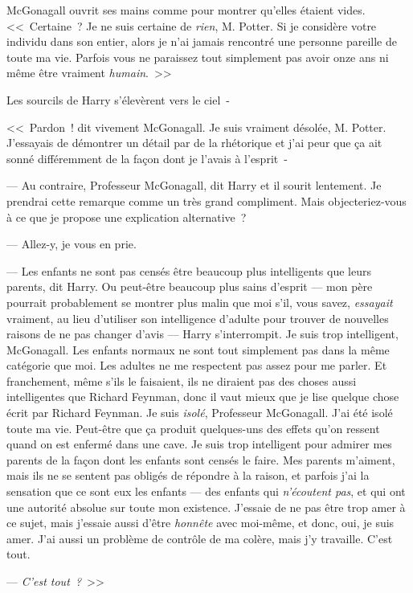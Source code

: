 McGonagall ouvrit ses mains comme pour montrer qu'elles étaient vides. <<~Certaine~? Je ne suis certaine de \emph{rien}, M. Potter. Si je considère votre individu dans son entier, alors je n'ai jamais rencontré une personne pareille de toute ma vie. Parfois vous ne paraissez tout simplement pas avoir onze ans ni même être vraiment \emph{humain}.~>>

Les sourcils de Harry s'élevèrent vers le ciel~-

<<~Pardon~! dit vivement McGonagall. Je suis vraiment désolée, M. Potter. J'essayais de démontrer un détail par de la rhétorique et j'ai peur que ça ait sonné différemment de la façon dont je l'avais à l'esprit~-

--- Au contraire, Professeur McGonagall, dit Harry et il sourit lentement. Je prendrai cette remarque comme un très grand compliment. Mais objecteriez-vous à ce que je propose une explication alternative~?

--- Allez-y, je vous en prie.

--- Les enfants ne sont pas censés être beaucoup plus intelligents que leurs parents, dit Harry. Ou peut-être beaucoup plus sains d'esprit — mon père pourrait probablement se montrer plus malin que moi s'il, vous savez, \emph{essayait} vraiment, au lieu d'utiliser son intelligence d'adulte pour trouver de nouvelles raisons de ne pas changer d'avis — Harry s'interrompit. Je suis trop intelligent, McGonagall. Les enfants normaux ne sont tout simplement pas dans la même catégorie que moi. Les adultes ne me respectent pas assez pour me parler. Et franchement, même s'ils le faisaient, ils ne diraient pas des choses aussi intelligentes que Richard Feynman, donc il vaut mieux que je lise quelque chose écrit par Richard Feynman. Je suis \emph{isolé}, Professeur McGonagall. J'ai été isolé toute ma vie. Peut-être que ça produit quelques-uns des effets qu'on ressent quand on est enfermé dans une cave. Je suis trop intelligent pour admirer mes parents de la façon dont les enfants sont censés le faire. Mes parents m'aiment, mais ils ne se sentent pas obligés de répondre à la raison, et parfois j'ai la sensation que ce sont eux les enfants — des enfants qui \emph{n'écoutent pas}, et qui ont une autorité absolue sur toute mon existence. J'essaie de ne pas être trop amer à ce sujet, mais j'essaie aussi d'être \emph{honnête} avec moi-même, et donc, oui, je suis amer. J'ai aussi un problème de contrôle de ma colère, mais j'y travaille. C'est tout.

--- \emph{C'est tout~?}~>>

